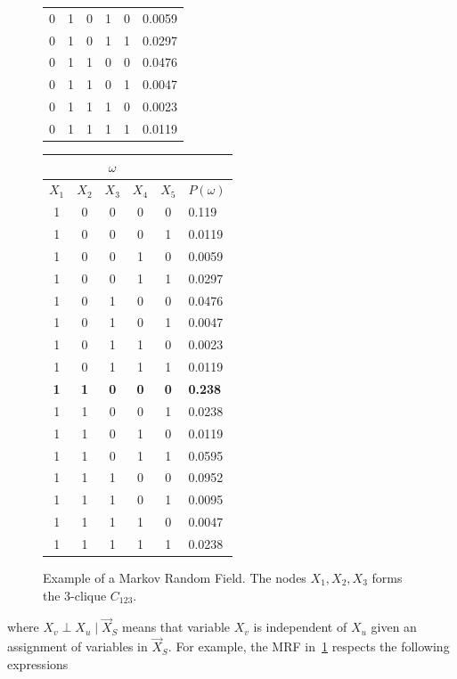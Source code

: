 \begin{figure}
\begin{minipage}{0.35\textwidth}
\begin{tabular}{|c|c|c|c|c|l|}
0 & 1 & 0 & 1 & 0 & 0.0059 \\
0 & 1 & 0 & 1 & 1 & 0.0297 \\
0 & 1 & 1 & 0 & 0 & 0.0476 \\
0 & 1 & 1 & 0 & 1 & 0.0047 \\
0 & 1 & 1 & 1 & 0 & 0.0023 \\
0 & 1 & 1 & 1 & 1 & 0.0119 \\
\hline
\end{tabular}
\end{minipage}%
\begin{minipage}{0.35\textwidth}
\tiny
\begin{tabular}{|c|c|c|c|c|l|}
\hline
\multicolumn{5}{|c|}{$\omega$} &\\
\hline
$X_1$ & $X_2$ & $X_3$ & $X_4$ & $X_5$ & $P(\omega)$\\
\hline
1 & 0 & 0 & 0 & 0 & 0.119 \\
1 & 0 & 0 & 0 & 1 & 0.0119 \\
1 & 0 & 0 & 1 & 0 & 0.0059 \\
1 & 0 & 0 & 1 & 1 & 0.0297 \\
1 & 0 & 1 & 0 & 0 & 0.0476 \\
1 & 0 & 1 & 0 & 1 & 0.0047 \\
1 & 0 & 1 & 1 & 0 & 0.0023 \\
1 & 0 & 1 & 1 & 1 & 0.0119 \\
\textbf{1} & \textbf{1} & \textbf{0} & \textbf{0} & \textbf{0} & \textbf{0.238} \\
1 & 1 & 0 & 0 & 1 & 0.0238 \\
1 & 1 & 0 & 1 & 0 & 0.0119 \\
1 & 1 & 0 & 1 & 1 & 0.0595 \\
1 & 1 & 1 & 0 & 0 & 0.0952 \\
1 & 1 & 1 & 0 & 1 & 0.0095 \\
1 & 1 & 1 & 1 & 0 & 0.0047 \\
1 & 1 & 1 & 1 & 1 & 0.0238 \\
\hline
\end{tabular}
\end{minipage}
\caption{Example of a Markov Random Field. The nodes $X_1, X_2, X_3$ forms the $3$-clique $C_{123}$.}
\label{ch2:fig:example-mrf}
\end{figure}

where $X_v  \perp  X_u \;|\; \vec{X}_S$ means that variable $X_v$ is independent of $X_u$ given an assignment of variables in $\vec{X}_S$.  For example, the MRF in~\cref{ch2:fig:example-mrf} respects the following expressions 

